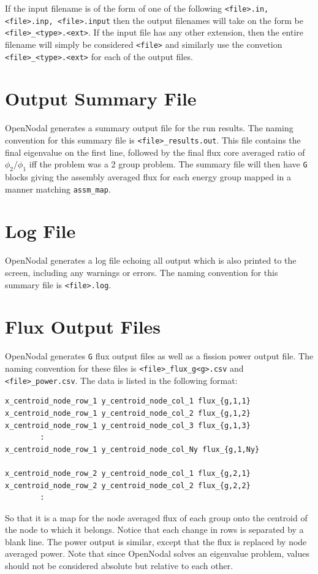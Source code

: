 If the input filename is of the form of one of the following \verb"<file>.in, <file>.inp, <file>.input" then the output filenames will take on the form be \verb"<file>_<type>.<ext>".
If the input file has any other extension, then the entire filename will simply be considered \verb"<file>" and similarly use the convetion \verb"<file>_<type>.<ext>" for each of the output files.

\section{Output Summary File}

OpenNodal generates a summary output file for the run results.
The naming convention for this summary file is \verb"<file>_results.out".
This file contains the final eigenvalue on the first line, followed by the final flux core averaged ratio of $\phi_2/\phi_1$ iff the problem was a 2 group problem.
The summary file will then have \verb"G" blocks giving the assembly averaged flux for each energy group mapped in a manner matching \verb"assm_map".

\section{Log File}

OpenNodal generates a log file echoing all output which is also printed to the screen, including any warnings or errors.
The naming convention for this summary file is \verb"<file>.log".

\section{Flux Output Files}

OpenNodal generates \verb"G" flux output files as well as a fission power output file.
The naming convention for these files is \verb"<file>_flux_g<g>.csv" and \verb"<file>_power.csv".
The data is listed in the following format:
\begin{verbatim}
x_centroid_node_row_1 y_centroid_node_col_1 flux_{g,1,1}
x_centroid_node_row_1 y_centroid_node_col_2 flux_{g,1,2}
x_centroid_node_row_1 y_centroid_node_col_3 flux_{g,1,3}
        :
x_centroid_node_row_1 y_centroid_node_col_Ny flux_{g,1,Ny}

x_centroid_node_row_2 y_centroid_node_col_1 flux_{g,2,1}
x_centroid_node_row_2 y_centroid_node_col_2 flux_{g,2,2}
        :
\end{verbatim}
So that it is a map for the node averaged flux of each group onto the centroid of the node to which it belongs.
Notice that each change in rows is separated by a blank line.
The power output is similar, except that the flux is replaced by node averaged power.
Note that since OpenNodal solves an eigenvalue problem, values should not be considered absolute but relative to each other.

